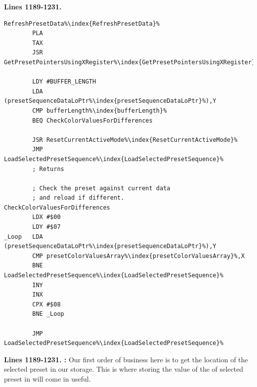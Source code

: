 \clearpage
\textbf{Lines 1189-1231. } 
\begin{lstlisting}[escapechar=\%]
RefreshPresetData%\index{RefreshPresetData}%    
        PLA 
        TAX 
        JSR GetPresetPointersUsingXRegister%\index{GetPresetPointersUsingXRegister}%

        LDY #BUFFER_LENGTH
        LDA (presetSequenceDataLoPtr%\index{presetSequenceDataLoPtr}%),Y
        CMP bufferLength%\index{bufferLength}%
        BEQ CheckColorValuesForDifferences

        JSR ResetCurrentActiveMode%\index{ResetCurrentActiveMode}%
        JMP LoadSelectedPresetSequence%\index{LoadSelectedPresetSequence}%
        ; Returns

        ; Check the preset against current data
        ; and reload if different.
CheckColorValuesForDifferences   
        LDX #$00
        LDY #$07
_Loop   LDA (presetSequenceDataLoPtr%\index{presetSequenceDataLoPtr}%),Y
        CMP presetColorValuesArray%\index{presetColorValuesArray}%,X
        BNE LoadSelectedPresetSequence%\index{LoadSelectedPresetSequence}%
        INY 
        INX 
        CPX #$08
        BNE _Loop

        JMP LoadSelectedPresetSequence%\index{LoadSelectedPresetSequence}%

\end{lstlisting}
\clearpage


\textbf{Lines 1189-1231. :} Our first order of business here is to get the location of the selected preset
in our storage. This is where storing the value of the of selected preset in  will come in useful. 

